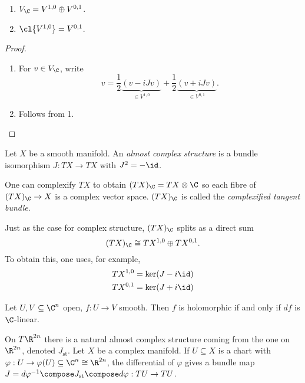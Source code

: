 \documentclass[a4paper]{article}
\begin{document}
\begin{lemma}\leavevmode
  \begin{enumerate}
  \item \(V_\C = V^{1, 0} \oplus V^{0, 1}\).
  \item \(\cl{V^{1, 0}} = V^{0, 1}\).
  \end{enumerate}
\end{lemma}

\begin{proof}\leavevmode
  \begin{enumerate}
  \item For \(v \in V_\C\), write
    \[
      v = \frac{1}{2}\underbrace{(v - iJv)}_{\in V^{1, 0}} + \frac{1}{2}\underbrace{(v + i Jv)}_{\in V^{0, 1}}.
    \]
  \item Follows from 1.
  \end{enumerate}
\end{proof}

\begin{definition}
  Let \(X\) be a smooth manifold. An \emph{almost complex structure} is a bundle isomorphism \(J: TX \to TX\) with \(J^2 = -\id\).
\end{definition}

One can complexify \(TX\) to obtain \((TX)_\C = TX \otimes \C\) so each fibre of \((TX)_\C \to X\) is a complex vector space. \((TX)_\C\) is called the \emph{complexified tangent bundle}.

Just as the case for complex structure, \((TX)_\C\) splits as a direct sum
\[
  (TX)_\C \cong TX^{1, 0} \oplus TX^{0, 1}.
\]
To obtain this, one uses, for example,
\begin{align*}
  TX^{1, 0} &= \ker (J - i \id) \\
  TX^{0, 1} &= \ker (J + i \id)
\end{align*}

\begin{ex}
  Let \(U, V \subseteq \C^n\) open, \(f: U \to V\) smooth. Then \(f\) is holomorphic if and only if \(df\) is \(\C\)-linear.
\end{ex}

On \(T\R^{2n}\) there is a natural almost complex structure coming from the one on \(\R^{2n}\), denoted \(J_{\text{st}}\). Let \(X\) be a complex manifold. If  \(U \subseteq X\) is a chart with \(\varphi: U \to \varphi(U) \subseteq \C^n \cong \R^{2n}\), the differential of \(\varphi\) gives a bundle map \(J = d\varphi^{-1} \compose J_{\text{st}} \compose d\varphi: TU \to TU\).
\end{document}
